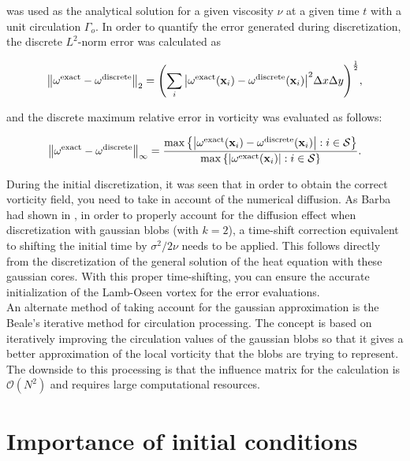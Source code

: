 was used as the analytical solution for a given viscosity $\nu$ at a given time $t$ with a unit circulation $\Gamma_o$. In order to quantify the error generated during discretization, the discrete $L^2$-norm error was calculated as 

\begin{equation}
{\left\| {{\omega ^{{\rm{exact}}}} - {\omega ^{{\rm{discrete}}}}} \right\|_2} = {\left( {\sum\limits_i {{{\left| {{\omega ^{{\rm{exact}}}}({{\bf{x}}_i}) - {\omega ^{{\rm{discrete}}}}({{\bf{x}}_i})} \right|}^2}\Delta x\Delta y} } \right)^{\frac{1}{2}}},
\label{eq:L2normEq}
\end{equation} 	

and the discrete maximum relative error in vorticity was evaluated as follows:

\begin{equation}
{\left\| {{\omega ^{{\rm{exact}}}} - {\omega ^{{\rm{discrete}}}}} \right\|_\infty } = \frac{{\max \left\{ {\left| {{\omega ^{{\rm{exact}}}}({{\bf{x}}_i}) - {\omega ^{{\rm{discrete}}}}({{\bf{x}}_i})} \right|:i \in {\mathcal{S}}} \right\}}}{{\max \left\{ {\left| {{\omega ^{{\rm{exact}}}}({{\bf{x}}_i})} \right|:i \in {\mathcal{S}}} \right\}}}.
\label{eq:maxRelEq}
\end{equation}

During the initial discretization, it was seen that in order to obtain the correct vorticity field, you need to take in account of the numerical diffusion. As Barba had shown in \cite{Barba2004a}, in order to properly account for the diffusion effect when discretization with gaussian blobs (with $k=2$), a time-shift correction equivalent to shifting the initial time by $\sigma^2/2\nu$ needs to be applied. This follows directly from the discretization of the general solution of the heat equation with these gaussian cores. With this proper time-shifting, you can ensure the accurate initialization of the Lamb-Oseen vortex for the error evaluations. \\

An alternate method of taking account for the gaussian approximation is the Beale's iterative method for circulation processing. The concept is based on iteratively improving the circulation values of the gaussian blobs so that it gives a better approximation of the local vorticity that the blobs are trying to represent. The downside to this processing is that the influence matrix for the calculation is $\mathcal{O}(N^2)$ and requires large computational resources.

\section{Importance of initial conditions}



